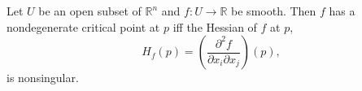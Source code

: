 Let $U$ be an open subset of $\mathbb{R}^n$ and $f: U \to \mathbb{R}$ be smooth. Then $f$ has a nondegenerate critical point at $p$ iff the Hessian of $f$ at $p$,
$$H_f(p) = \left(\frac{\partial^2 f}{\partial x_i \partial x_j}\right)(p),$$
is nonsingular.
